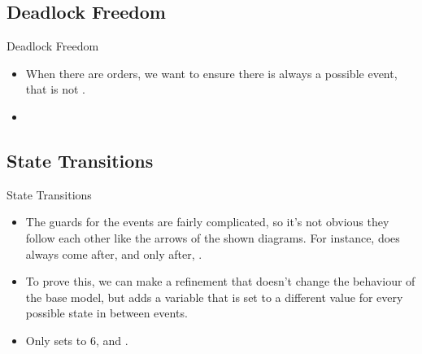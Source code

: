 \documentclass[
	hyperref={pdfusetitle,hidelinks},
	10pt,
    handout,
]{beamer}
\begin{document}
\subsection{Deadlock Freedom} %

\begin{frame}{Deadlock Freedom}
	\begin{itemize}
		\item<+-> When there are orders, we want to ensure there is always a possible event, that is not .
		\item<+-> 
	\end{itemize}
\end{frame}

\subsection{State Transitions} %

\begin{frame}{State Transitions}
	\begin{itemize}
		\item<+-> The guards for the events are fairly complicated, so it's not obvious they follow each other like the arrows of the shown diagrams. For instance, does  always come after, and only after, .
		\item<+-> To prove this, we can make a refinement that doesn't change the behaviour of the base model, but adds a  variable that is set to a different value for every possible state in between events.
		\item<+-> Only  sets  to 6, and .
	\end{itemize}
\end{frame}

\end{document}
